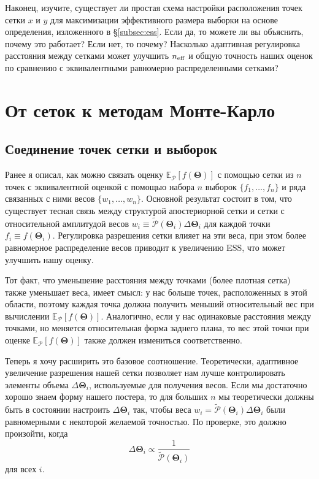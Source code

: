 \documentclass[12pt, titlepage]{article}
\newcommand{\meanwrt}[2]{\ensuremath{\mathbb{E}_{{#2}}\left[{#1}\right]}}
\newcommand{\params}{\ensuremath{\boldsymbol\Theta}}
\newcommand{\posterior}{\ensuremath{\mathcal{P}}}
\begin{document}
Наконец, изучите, существует ли простая схема настройки расположения точек сетки $x$ и $y$ для максимизации эффективного размера выборки на основе определения, изложенного в \S\ref{subsec:ess}. Если да, то можете ли вы объяснить, почему это работает? Если нет, то почему? Насколько адаптивная регулировка расстояния между сетками может улучшить $n_{\rm eff}$ и общую точность наших оценок по сравнению с эквивалентными равномерно распределенными сетками?

\section{От сеток к методам Монте-Карло} \label{sec:montecarlo}

\subsection{Соединение точек сетки и выборок}
\label{subsec:grid_to_samp}

Ранее я описал, как можно связать оценку $\meanwrt{f(\params)}{\posterior}$ с помощью сетки из $n$ точек с эквивалентной оценкой с помощью набора $n$ выборок $\{ f_1, \dots, f_n\}$ и ряда связанных с ними весов $\{ w_1, \dots, w_n \}$. Основной результат состоит в том, что существует тесная связь между структурой апостериорной сетки и сетки с относительной амплитудой весов $w_i \equiv \tilde{\posterior}(\params_i)\Delta\params_i$ для каждой точки $f_i \equiv f(\params_i)$. Регулировка разрешения сетки влияет на эти веса, при этом более равномерное распределение весов приводит к увеличению ESS, что может улучшить нашу оценку.

Тот факт, что уменьшение расстояния между точками (более плотная сетка) также уменьшает веса, имеет смысл: у нас больше точек, расположенных в этой области, поэтому каждая точка должна получить меньший относительный вес при вычислении $\meanwrt{f(\params)}{\posterior}$. Аналогично, если у нас одинаковые расстояния между точками, но меняется относительная форма заднего плана, то вес этой точки при оценке $\meanwrt{f(\params)}{\posterior}$ также должен измениться соответственно.

Теперь я хочу расширить это базовое соотношение. Теоретически, адаптивное увеличение разрешения нашей сетки позволяет нам лучше контролировать элементы объема $\Delta \params_i$, используемые для получения весов. Если мы достаточно хорошо знаем форму нашего постера, то для больших $n$ мы теоретически должны быть в состоянии настроить $\Delta \params_i$ так, чтобы веса $w_i = \tilde{\posterior}(\params_i)\Delta\params_i$ были равномерными с некоторой желаемой точностью. По проверке, это должно произойти, когда
\begin{equation}
    \Delta \params_i \propto \frac{1}{\tilde{\posterior}(\params_i)}
\end{equation}
для всех $i$.
\end{document}
